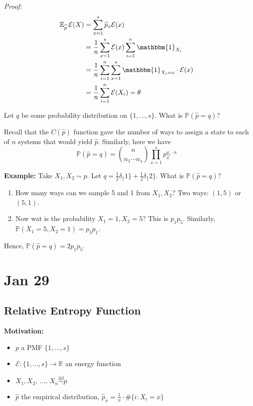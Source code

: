 \documentclass[12pt]{report}
\renewcommand{\hat}[1]{\widehat{#1}}
\renewcommand{\P}{\mathbb{P}}
\newcommand{\R}{\mathbb{R}}
\newcommand{\E}{\mathbb{E}}
\newcommand{\ind}{\mathbbm{1}}
\newcommand{\Ec}{\mathcal{E}}
\newcommand{\iid}{\overset{\text{iid}}{\sim}}
\newcommand*{\tbf}[1]{\ifmmode\mathbf{#1}\else\textbf{#1}\fi}
\newenvironment*{tbox}[2][gray]{
    \begin{tcolorbox}[
        parbox=false,
        colback=#1!5!white,
        colframe=#1!75!black,
        breakable,
        title={#2}
    ]}
    {\end{tcolorbox}}
\begin{document}
\begin{tbox}{\textbf{Large Deviation Principle:} Take $p$ on $\{1, 2, \dots, s\}$, $\Ec: \{1, \dots, s\} \to \R$. Observe $X_1, X_2, \, \dots,\, X_n \overset{\text{iid}}{\sim} p$. Define
        \[\frac{1}{n}\sum_{x=1}^n \Ec(X_k) = \theta\]. Define the empirical distribution $\hat p_x = \frac{1}{n}\cdot \#\{i: X_i = x\}$. Then $\E_{\hat p}\, \Ec(X) = \theta$}

    \emph{Proof:}
    \begin{align*}
        \E_{\hat p}\, \Ec(X) & = \sum_{x=1}^s \hat p_x \Ec(x)                                   \\
                             & = \frac{1}{n}\sum_{x=1}^s \Ec(x) \sum_{i=1}^n \ind_{X_i}         \\
                             & = \frac{1}{n}\sum_{i=1}^n \sum_{x=1}^s \ind_{X_i=x} \cdot \Ec(x) \\
                             & = \frac{1}{n} \sum_{i=1}^{n} \Ec(X_i) = \theta
    \end{align*}
\end{tbox}

Let $q$ be some probability distribution on $\{1, \dots, s\}$. What is $\P(\hat p = q)$?

Recall that the $C(\hat p)$ function gave the number of ways to assign a state to each of $n$ systems that would yield $\hat p$. Similarly, here we have
\[\P(\hat p = q) = \binom{n}{n_1 \cdots n_s} \prod_{x=1}^s p_x^{q_x \cdot n}\]

\tbf{Example:} Take $X_1, X_2 \sim p$. Let $q = \frac{1}{2} \delta_\{1\} + \frac{1}{2} \delta_\{2\}$. What is $\P(\hat p = q)$?
\begin{enumerate}
    \item How many ways can we sample 5 and 1 from $X_1, X_2$? Two ways: $(1, 5)$ or $(5, 1)$.
    \item Now wat is the probability $X_1 = 1, X_2 = 5$? This is $p_1 p_5$. Similarly, $\P(X_1 = 5, X_2 = 1) = p_5 p_1$.
\end{enumerate}

Hence, $\P(\hat p = q) = 2p_1 p_5$.

\section{Jan 29}
\subsection{Relative Entropy Function}
\tbf{Motivation:}
\begin{itemize}
    \item $p$ a PMF $\{1, \dots, s\}$
    \item $\Ec: \{1, \dots, s\} \to \R$ an energy function
    \item $X_1, X_2, \, \dots,\, X_n \iid p$
    \item $\hat p$ the empirical distribution, $\hat p_x = \frac{1}{n}\cdot \#\{i: X_i = x\}$
\end{itemize}
\end{document}
